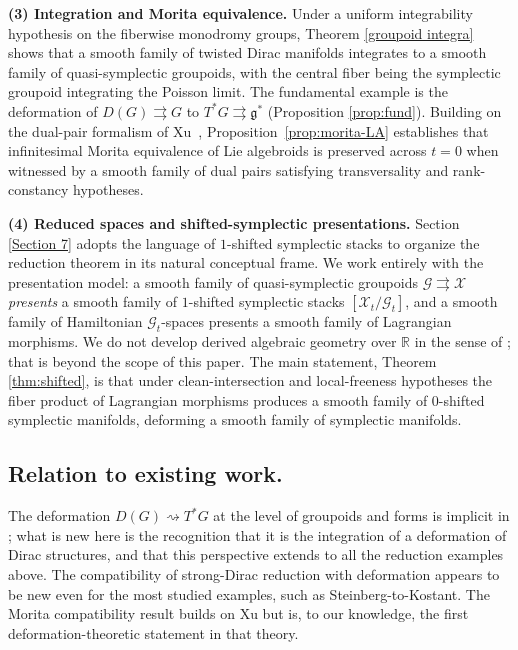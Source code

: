 \documentclass[reqno]{amsart}
\theoremstyle{plain}
\theoremstyle{definition}
\begin{document}
\smallskip
\noindent\textbf{(3) Integration and Morita equivalence.}
Under a uniform integrability hypothesis on the fiberwise monodromy groups, Theorem \ref{groupoid integra} shows that a smooth family of twisted Dirac manifolds integrates to a smooth family of quasi-symplectic groupoids, with the central fiber being
the symplectic groupoid integrating the Poisson limit. The fundamental example is the
deformation of $D(G)\rightrightarrows G$ to $T^*G\rightrightarrows\mathfrak{g}^*$
(Proposition \ref{prop:fund}). Building on the dual-pair formalism of Xu~\cite{xu2004momentum},
Proposition~\ref{prop:morita-LA} establishes that infinitesimal Morita equivalence of Lie algebroids
is preserved across $t=0$ when witnessed by a smooth family of dual pairs satisfying transversality
and rank-constancy hypotheses.
 
\smallskip
\noindent\textbf{(4) Reduced spaces and shifted-symplectic presentations.}
Section \ref{Section 7} adopts the language of $1$-shifted symplectic stacks
\cite{pantev2013shifted, calaque2021derived} to organize the reduction theorem in its natural conceptual frame.
We work entirely with the presentation model: a smooth family of quasi-symplectic groupoids
$\mathcal{G}\rightrightarrows\mathcal{X}$ \emph{presents} a smooth family of $1$-shifted symplectic
stacks $[\mathcal{X}_t/\mathcal{G}_t]$, and a smooth family of Hamiltonian $\mathcal{G}_t$-spaces
presents a smooth family of Lagrangian morphisms. We do not develop derived algebraic geometry
over $\mathbb{R}$ in the sense of \cite{pantev2013shifted, calaque2021derived}; that is beyond the scope of this paper.
The main statement, Theorem \ref{thm:shifted}, is that under clean-intersection and local-freeness hypotheses the fiber product of Lagrangian morphisms produces a smooth family
of $0$-shifted symplectic manifolds, deforming a smooth family of symplectic manifolds.
 
\subsection*{Relation to existing work.}
The deformation $D(G)\rightsquigarrow T^*G$ at the level of groupoids and forms is implicit
in \cite{burelle2026deformations}; what is new here is the recognition that it is the integration
of a deformation of Dirac structures, and that this perspective extends to all the reduction
examples above. The compatibility of strong-Dirac reduction with deformation appears to be new
even for the most studied examples, such as Steinberg-to-Kostant. The Morita compatibility
result builds on Xu \cite{xu2004momentum} but is, to our knowledge, the first deformation-theoretic statement in that theory.
 
\end{document}
